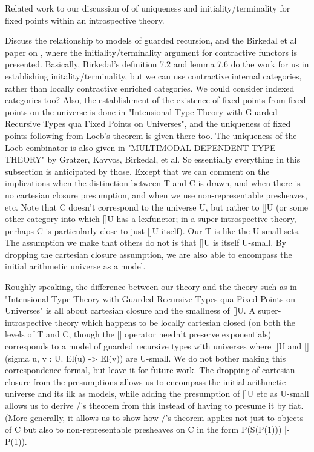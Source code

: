 \begin{TODOblock}
Related work to our discussion of of uniqueness and initiality/terminality for fixed points within an introspective theory.

Discuss the relationship to models of guarded recursion, and the Birkedal et al paper on , where the initiality/terminality argument for contractive functors is presented. Basically, Birkedal's definition 7.2 and lemma 7.6 do the work for us in establishing initality/terminality, but we can use contractive internal categories, rather than locally contractive enriched categories. We could consider indexed categories too? Also, the establishment of the existence of fixed points from fixed points on the universe is done in "Intensional Type Theory with Guarded Recursive Types qua Fixed Points on Universes", and the uniqueness of fixed points following from Loeb's theorem is given there too. The uniqueness of the Loeb combinator is also given in "MULTIMODAL DEPENDENT TYPE THEORY" by Gratzer, Kavvos, Birkedal, et al. So essentially everything in this subsection is anticipated by those. Except that we can comment on the implications when the distinction between T and C is drawn, and when there is no cartesian closure presumption, and when we use non-representable presheaves, etc. Note that C doesn't correspond to the universe U, but rather to []U (or some other category into which []U has a lexfunctor; in a super-introspective theory, perhaps C is particularly close to just []U itself). Our T is like the U-small sets. The assumption we make that others do not is that []U is itself U-small. By dropping the cartesian closure assumption, we are also able to encompass the initial arithmetic universe as a model.

Roughly speaking, the difference between our theory and the theory such as in "Intensional Type Theory with Guarded Recursive Types qua Fixed Points on Universes" is all about cartesian closure and the smallness of []U. A super-introspective theory which happens to be locally cartesian closed (on both the levels of T and C, though the [] operator needn't preserve exponentials) corresponds to a model of guarded recursive types with universes where []U and [](sigma u, v : U. El(u) -> El(v)) are U-small. We do not bother making this correspondence formal, but leave it for future work. The dropping of cartesian closure from the presumptions allows us to encompass the initial arithmetic universe and its ilk as models, while adding the presumption of []U etc as U-small allows us to derive \Loeb/'s theorem from this instead of having to presume it by fiat. (More generally, it allows us to show how \Loeb/'s theorem applies not just to objects of C but also to non-representable presheaves on C in the form P(S(P(1))) |- P(1)).
\end{TODOblock}

